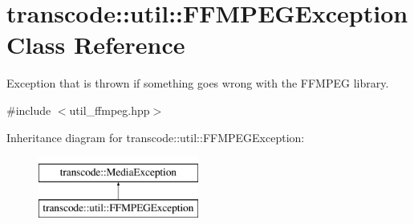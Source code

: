 \hypertarget{classtranscode_1_1util_1_1FFMPEGException}{
\section{transcode::util::FFMPEGException Class Reference}
\label{classtranscode_1_1util_1_1FFMPEGException}
}


Exception that is thrown if something goes wrong with the FFMPEG library.  




{\ttfamily \#include $<$util\_\-ffmpeg.hpp$>$}

Inheritance diagram for transcode::util::FFMPEGException:\begin{figure}[H]
\begin{center}
\leavevmode
\includegraphics[height=2.000000cm]{classtranscode_1_1util_1_1FFMPEGException}
\end{center}
\end{figure}
